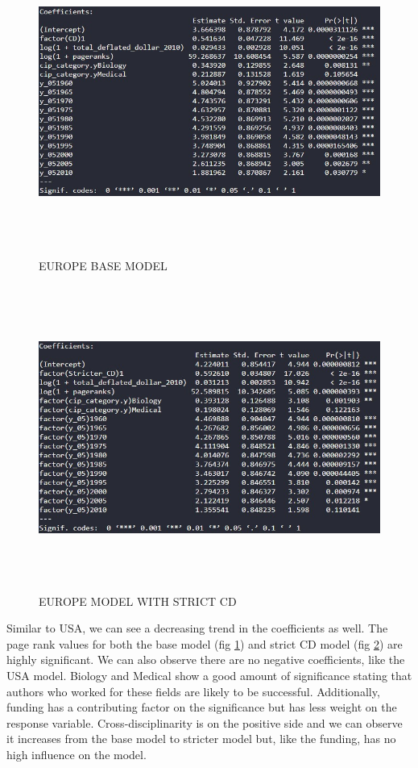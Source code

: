 \documentclass[a4paper,11pt]{article}
\theoremstyle{mytheor}
\begin{document}
\begin{figure}[h]
    \centering
    \includegraphics[width=16cm, height=10cm]{europe_coeff_non.jpg}
    \caption{EUROPE BASE MODEL}
    \label{fig:EUROPE BASE CORRELATION}
\end{figure} 

\begin{figure}[h]
    \centering
    \includegraphics[width=16cm, height=10cm]{europe_coeff_str.jpg}
    \caption{EUROPE MODEL WITH STRICT CD}
    \label{fig:EUROPE STRICT CORRELATION}
\end{figure} 
\FloatBarrier
\newpage
Similar to USA, we can see a decreasing trend in the coefficients as well. The page rank values for both the base model (fig \ref{fig:EUROPE BASE CORRELATION}) and strict CD model (fig \ref{fig:EUROPE STRICT CORRELATION}) are highly significant. We can also observe there are no negative coefficients, like the USA model. Biology and Medical show a good amount of significance stating that authors who worked for these fields are likely to be successful. Additionally, funding has a contributing factor on the significance but has less weight on the response variable. Cross-disciplinarity is on the positive side and we can observe it increases from the base model to stricter model but, like the funding, has no high influence on the model. \\
\end{document}
